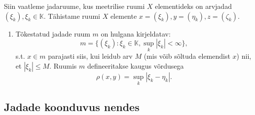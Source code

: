 \documentclass{article}[12pt]
\newcommand{\K}{\mathbb{K}}
\theoremstyle{definition}
\theoremstyle{definition}
\begin{document}
Siin vaatleme jadaruume, kus meetrilise ruumi $X$ elementideks on arvjadad $(\xi_k),\xi_k\in\K$.
Tähistame ruumi $X$ elemente $x=(\xi_k),y=(\eta_k),z=(\zeta_k)$.
\begin{enumerate}
	\item Tõkestatud jadade ruum $m$ on hulgana kirjeldatav:
	\[
		m=\{ (\xi_k):\xi_k\in\K,\sup_k |\xi_k|<\infty \},
	\]
	s.t. $x\in m$ parajasti siis, kui leidub arv $M$ (mis võib sõltuda elemendist $x$) nii, et $|\xi_k|\leq M$.
	Ruumis $m$ defineeritakse kaugus võrdusega
	\[
		\rho(x,y) = \sup_k |\xi_k-\eta_k|.
	\]
\end{enumerate}

\subsection*{Jadade koonduvus nendes}
\end{document}
